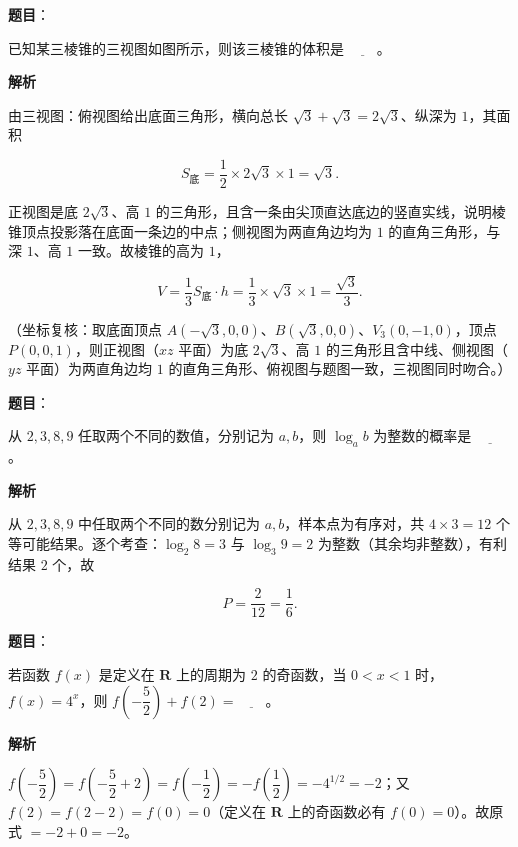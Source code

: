 \begin{answer}

\textbf{题目}：

已知某三棱锥的三视图如图所示，则该三棱锥的体积是 \(\underline{\qquad}\)。
\nopagebreak[4]
\begin{center}\end{center}
\nopagebreak[4]
\textbf{解析}

由三视图：俯视图给出底面三角形，横向总长 \(\sqrt{3}+\sqrt{3}=2\sqrt{3}\)、纵深为 \(1\)，其面积

\nopagebreak[4]
\[
S_{\text{底}}=\frac{1}{2}\times2\sqrt{3}\times1=\sqrt{3}.
\]

正视图是底 \(2\sqrt{3}\)、高 \(1\) 的三角形，且含一条由尖顶直达底边的竖直实线，说明棱锥顶点投影落在底面一条边的中点；侧视图为两直角边均为 \(1\) 的直角三角形，与深 \(1\)、高 \(1\) 一致。故棱锥的高为 \(1\)，

\nopagebreak[4]
\[
V=\frac{1}{3}S_{\text{底}}\cdot h=\frac{1}{3}\times\sqrt{3}\times1=\frac{\sqrt{3}}{3}.
\]

（坐标复核：取底面顶点 \(A(-\sqrt{3},0,0)\)、\(B(\sqrt{3},0,0)\)、\(V_3(0,-1,0)\)，顶点 \(P(0,0,1)\)，则正视图（\(xz\) 平面）为底 \(2\sqrt{3}\)、高 \(1\) 的三角形且含中线、侧视图（\(yz\) 平面）为两直角边均 \(1\) 的直角三角形、俯视图与题图一致，三视图同时吻合。）


\end{answer}
\begin{answer}

\textbf{题目}：

从 \(2,3,8,9\) 任取两个不同的数值，分别记为 \(a,b\)，则 \(\log_{a}b\) 为整数的概率是 \(\underline{\qquad}\)。

\textbf{解析}

从 \(2,3,8,9\) 中任取两个不同的数分别记为 \(a,b\)，样本点为有序对，共 \(4\times3=12\) 个等可能结果。逐个考查：\(\log_{2}8=3\) 与 \(\log_{3}9=2\) 为整数（其余均非整数），有利结果 \(2\) 个，故

\nopagebreak[4]
\[
P=\frac{2}{12}=\frac{1}{6}.
\]


\end{answer}
\begin{answer}

\textbf{题目}：

若函数 \(f(x)\) 是定义在 \(\mathbf{R}\) 上的周期为 \(2\) 的奇函数，当 \(0<x<1\) 时，\(f(x)=4^{x}\)，则 \(f\left(-\dfrac{5}{2}\right)+f(2)=\underline{\qquad}\)。

\textbf{解析}

\(f\left(-\dfrac{5}{2}\right)=f\left(-\dfrac{5}{2}+2\right)=f\left(-\dfrac{1}{2}\right)=-f\left(\dfrac{1}{2}\right)=-4^{1/2}=-2\)；又 \(f(2)=f(2-2)=f(0)=0\)（定义在 \(\mathbf{R}\) 上的奇函数必有 \(f(0)=0\)）。故原式 \(=-2+0=-2\)。


\end{answer}
